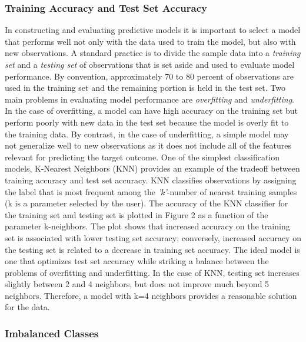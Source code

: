 \documentclass[sigconf]{acmart}
\begin{document}

\subsubsection{Training Accuracy and Test Set Accuracy}

In constructing and evaluating predictive models it is important to select 
a model that performs well not only with the data used to train the model, 
but also with new observations. A standard practice is to divide the sample 
data into a \emph{training set} and a \emph{testing set} of observations 
that is set aside and used to evaluate model performance. By convention, 
approximately 70 to 80 percent of observations are used in the training set 
and the remaining portion is held in the test set. Two main problems in 
evaluating model performance are \emph{overfitting} and \emph{underfitting}. 
In the case of overfitting, a model can have high accuracy on the training 
set but perform poorly with new data in the test set because the model is 
overly fit to the training data. By contrast, in the case of underfitting, 
a simple model may not generalize well to new observations as it does not 
include all of the features relevant for predicting the target outcome. 
One of the simplest classification models, K-Nearest Neighbors (KNN) 
provides an example of the tradeoff between training accuracy and test 
set accuracy. KNN classifies observations by assigning the label that 
is most frequent among the \textit{'k'}-number of nearest training samples 
(k is a parameter selected by the user). The accuracy of the KNN classifier 
for the training set and testing set is plotted in Figure 2 as a function
of the parameter k-neighbors. The plot shows that increased accuracy on 
the training set is associated with lower testing set accuracy; conversely, 
increased accuracy on the testing set is related to a decrease in training 
set accuracy. The ideal model is one that optimizes test set accuracy while 
striking a balance between the problems of overfitting and underfitting. 
In the case of KNN, testing set increases slightly between 2 and 4 neighbors, 
but does not improve much beyond 5 neighbors. Therefore, a model with k=4 
neighbors provides a reasonable solution for the data. 


\subsubsection{Imbalanced Classes}
\end{document}
